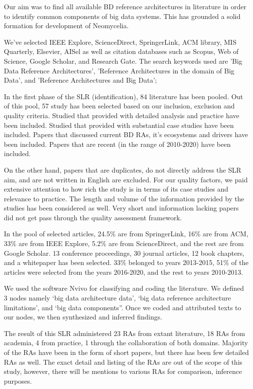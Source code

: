 \documentclass[conference]{IEEEtran}
\begin{document}
Our aim was to find all available BD reference architectures in literature in order to identify common components of big data systems. This has grounded a solid formation for development of Neomycelia.

We’ve selected IEEE Explore, ScienceDirect, SpringerLink, ACM library, MIS Quarterly, Elsevier, AISel as well as citation databases such as Scopus, Web of Science, Google Scholar, and Research Gate. The search keywords used are 'Big Data Reference Architectures', 'Reference Architectures in the domain of Big Data', and 'Reference Architectures and Big Data';

In the first phase of the SLR (identification), 84 literature has been pooled. Out of this pool, 57 study has been selected based on our inclusion, exclusion and quality criteria. Studied that provided with detailed analysis and practice have been included. Studied that provided with substantial case studies have been included. Papers that discussed current BD RAs, it’s ecosystems and drivers have been included. Papers that are recent (in the range of 2010-2020) have been included.

On the other hand, papers that are duplicates, do not directly address the SLR aim, and are not written in English are excluded. For our quality factors, we paid extensive attention to how rich the study is in terms of its case studies and relevance to practice. The length and volume of the information provided by the studies has been considered as well. Very short and information lacking papers did not get pass through the quality assessment framework.

In the pool of selected articles, 24.5\% are from SpringerLink, 16\% are from ACM, 33\% are from IEEE Explore, 5.2\% are from ScienceDirect, and the rest are from Google Scholar. 13 conference proceedings, 30 journal articles, 12 book chapters, and a whitepaper has been selected. 33\% belonged to years 2013-2015, 51\% of the articles were selected from the years 2016-2020, and the rest to years 2010-2013.

We used the software Nvivo for classifying and coding the literature. We defined 3 nodes namely ‘big data architecture data’, ‘big data reference architecture limitations’, and ‘big data components”. Once we coded and attributed texts to our nodes, we then synthesized and inferred findings.

The result of this SLR administered 23 RAs from extant literature, 18 RAs from academia, 4 from practice, 1 through the collaboration of both domains. Majority of the RAs have been in the form of short papers, but there has been few detailed RAs as well. The exact detail and listing of the RAs are out of the scope of this study, however, there will be mentions to various RAs for comparison, inference purposes.
\end{document}
